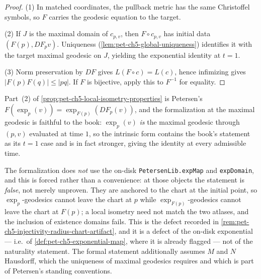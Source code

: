 \begin{proof}

  \sketch
  (1) In matched coordinates, the pullback metric has the same Christoffel symbols,
  so $F$ carries the geodesic equation to the target.

  (2) If $J$ is the maximal domain of $c_{p,v}$, then $F\circ c_{p,v}$ has initial
  data $(F(p),DF_pv)$.  Uniqueness
  (\cref{lem:pet-ch5-global-uniqueness}) identifies it with the target maximal
  geodesic on $J$, yielding the exponential identity at $t=1$.

  (3) Norm preservation by $DF$ gives $L(F\circ c)=L(c)$, hence infimizing gives
  $|F(p)F(q)|\le|pq|$.  If $F$ is bijective, apply this to $F^{-1}$ for equality.
\end{proof}

\begin{remark}
  \label{rem:pet-ch5-exp-naturality-intrinsic}
  Part~(2) of \cref{prop:pet-ch5-local-isometry-properties} is Petersen's
  $F(\exp_p(v))=\exp_{F(p)}(DF_p(v))$, and the formalization at the maximal
  geodesic is faithful to the book: $\exp_p(v)$ \emph{is} the maximal geodesic
  through $(p,v)$ evaluated at time $1$, so the intrinsic form contains the book's
  statement as its $t=1$ case and is in fact stronger, giving the identity at every
  admissible time.

  The formalization does \emph{not} use the on-disk \texttt{PetersenLib.expMap} and
  \texttt{expDomain}, and this is forced rather than a convenience: at those objects
  the statement is \emph{false}, not merely unproven. They are anchored to the chart
  at the initial point, so $\exp_p$-geodesics cannot leave the chart at $p$ while
  $\exp_{F(p)}$-geodesics cannot leave the chart at $F(p)$; a local isometry need
  not match the two atlases, and the inclusion of existence domains fails. This is
  the defect recorded in \cref{rem:pet-ch5-injectivity-radius-chart-artifact}, and
  it is a defect of the on-disk exponential — i.e.\ of
  \cref{def:pet-ch5-exponential-map}, where it is already flagged — not of the
  naturality statement. The formal statement additionally assumes $M$ and $N$
  Hausdorff, which the uniqueness of maximal geodesics requires and which is part of
  Petersen's standing conventions.
\end{remark}

